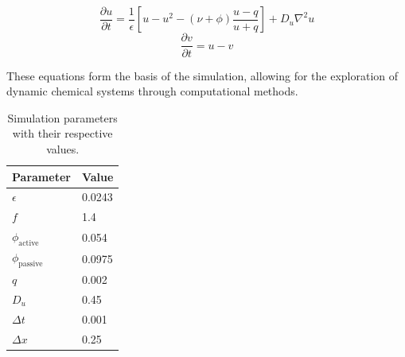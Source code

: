 \begin{equation}
    \frac{\partial u}{\partial t} = \frac{1}{\epsilon} \left[ u - u^2 - (\nu + \phi) \frac{u - q}{u + q} \right] + D_u \nabla^2 u
    \label{eq:u-partial-t}
\end{equation}
\begin{equation}
    \frac{\partial v}{\partial t} = u - v
    \label{eq:v-partial-t}
\end{equation}


These equations form the basis of the simulation, allowing for the exploration of dynamic chemical systems through computational methods.



\begin{table}[H]
    \centering
    \begin{tabularx}{\textwidth}{|X|X|} 
        \hline
    \textbf{Parameter} & \textbf{Value} \\ \hline
    $\epsilon$         & 0.0243         \\
    $f$                & 1.4            \\ 
    $\phi_{\text{active}}$ & 0.054          \\ 
    $\phi_{\text{passive}}$ & 0.0975          \\
    $q$                & 0.002          \\ 
    $D_u$              & 0.45           \\ 
    $\Delta t$         & 0.001          \\
    $\Delta x$              & 0.25           \\
    \hline
    \end{tabularx}
    \caption{Simulation parameters with their respective values.}
    \label{tab:simulation-parameters}
    \end{table}
